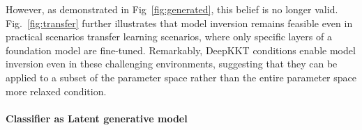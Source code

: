 However, as demonstrated in Fig~\ref{fig:generated}, this belief is no longer valid. Fig.~\ref{fig:transfer} further illustrates that model inversion remains feasible even in practical scenarios  transfer learning scenarios, where only specific layers of a foundation model are fine-tuned. Remarkably, DeepKKT conditions enable model inversion even in these challenging environments, suggesting that they can be applied to a subset of the parameter space rather than the entire parameter space \ie {} more relaxed condition.





\paragraph{Classifier as Latent generative model}

